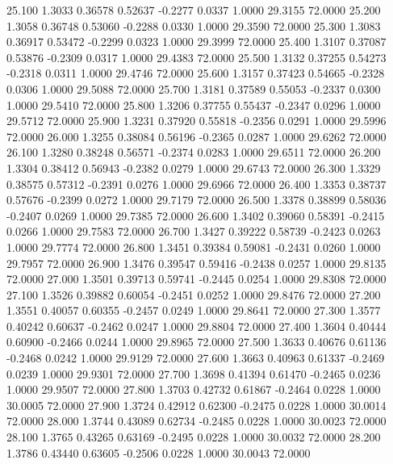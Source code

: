   25.100   1.3033   0.36578   0.52637  -0.2277   0.0337   1.0000  29.3155  72.0000
  25.200   1.3058   0.36748   0.53060  -0.2288   0.0330   1.0000  29.3590  72.0000
  25.300   1.3083   0.36917   0.53472  -0.2299   0.0323   1.0000  29.3999  72.0000
  25.400   1.3107   0.37087   0.53876  -0.2309   0.0317   1.0000  29.4383  72.0000
  25.500   1.3132   0.37255   0.54273  -0.2318   0.0311   1.0000  29.4746  72.0000
  25.600   1.3157   0.37423   0.54665  -0.2328   0.0306   1.0000  29.5088  72.0000
  25.700   1.3181   0.37589   0.55053  -0.2337   0.0300   1.0000  29.5410  72.0000
  25.800   1.3206   0.37755   0.55437  -0.2347   0.0296   1.0000  29.5712  72.0000
  25.900   1.3231   0.37920   0.55818  -0.2356   0.0291   1.0000  29.5996  72.0000
  26.000   1.3255   0.38084   0.56196  -0.2365   0.0287   1.0000  29.6262  72.0000
  26.100   1.3280   0.38248   0.56571  -0.2374   0.0283   1.0000  29.6511  72.0000
  26.200   1.3304   0.38412   0.56943  -0.2382   0.0279   1.0000  29.6743  72.0000
  26.300   1.3329   0.38575   0.57312  -0.2391   0.0276   1.0000  29.6966  72.0000
  26.400   1.3353   0.38737   0.57676  -0.2399   0.0272   1.0000  29.7179  72.0000
  26.500   1.3378   0.38899   0.58036  -0.2407   0.0269   1.0000  29.7385  72.0000
  26.600   1.3402   0.39060   0.58391  -0.2415   0.0266   1.0000  29.7583  72.0000
  26.700   1.3427   0.39222   0.58739  -0.2423   0.0263   1.0000  29.7774  72.0000
  26.800   1.3451   0.39384   0.59081  -0.2431   0.0260   1.0000  29.7957  72.0000
  26.900   1.3476   0.39547   0.59416  -0.2438   0.0257   1.0000  29.8135  72.0000
  27.000   1.3501   0.39713   0.59741  -0.2445   0.0254   1.0000  29.8308  72.0000
  27.100   1.3526   0.39882   0.60054  -0.2451   0.0252   1.0000  29.8476  72.0000
  27.200   1.3551   0.40057   0.60355  -0.2457   0.0249   1.0000  29.8641  72.0000
  27.300   1.3577   0.40242   0.60637  -0.2462   0.0247   1.0000  29.8804  72.0000
  27.400   1.3604   0.40444   0.60900  -0.2466   0.0244   1.0000  29.8965  72.0000
  27.500   1.3633   0.40676   0.61136  -0.2468   0.0242   1.0000  29.9129  72.0000
  27.600   1.3663   0.40963   0.61337  -0.2469   0.0239   1.0000  29.9301  72.0000
  27.700   1.3698   0.41394   0.61470  -0.2465   0.0236   1.0000  29.9507  72.0000
  27.800   1.3703   0.42732   0.61867  -0.2464   0.0228   1.0000  30.0005  72.0000
  27.900   1.3724   0.42912   0.62300  -0.2475   0.0228   1.0000  30.0014  72.0000
  28.000   1.3744   0.43089   0.62734  -0.2485   0.0228   1.0000  30.0023  72.0000
  28.100   1.3765   0.43265   0.63169  -0.2495   0.0228   1.0000  30.0032  72.0000
  28.200   1.3786   0.43440   0.63605  -0.2506   0.0228   1.0000  30.0043  72.0000
